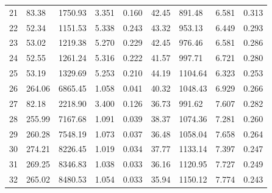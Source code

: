 \documentclass[12pt]{article}
\begin{document}
\begin{table}
\begin{tabular}{| l | l l l l | l l l l |}
	21 & 83.38 & 1750.93 & 3.351 & 0.160 & 42.45 & 891.48 & 6.581 & 0.313 \\
	22 & 52.34 & 1151.53 & 5.338 & 0.243 & 43.32 & 953.13 & 6.449 & 0.293 \\
	23 & 53.02 & 1219.38 & 5.270 & 0.229 & 42.45 & 976.46 & 6.581 & 0.286 \\
	24 & 52.55 & 1261.24 & 5.316 & 0.222 & 41.57 & 997.71 & 6.721 & 0.280 \\
	25 & 53.19 & 1329.69 & 5.253 & 0.210 & 44.19 & 1104.64 & 6.323 & 0.253 \\
	26 & 264.06 & 6865.45 & 1.058 & 0.041 & 40.32 & 1048.43 & 6.929 & 0.266 \\
	27 & 82.18 & 2218.90 & 3.400 & 0.126 & 36.73 & 991.62 & 7.607 & 0.282 \\
	28 & 255.99 & 7167.68 & 1.091 & 0.039 & 38.37 & 1074.36 & 7.281 & 0.260 \\
	29 & 260.28 & 7548.19 & 1.073 & 0.037 & 36.48 & 1058.04 & 7.658 & 0.264 \\
	30 & 274.21 & 8226.45 & 1.019 & 0.034 & 37.77 & 1133.14 & 7.397 & 0.247 \\
	31 & 269.25 & 8346.83 & 1.038 & 0.033 & 36.16 & 1120.95 & 7.727 & 0.249 \\
	32 & 265.02 & 8480.53 & 1.054 & 0.033 & 35.94 & 1150.12 & 7.774 & 0.243 \\
	\hline
\end{tabular}
\end{table}
\end{document}
